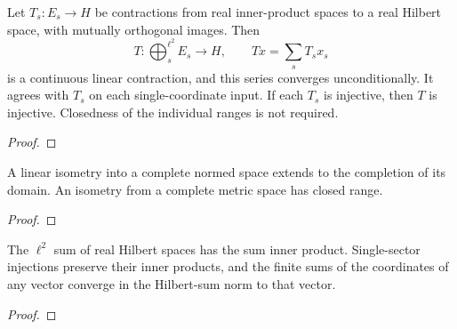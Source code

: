 \begin{supporting}
\begin{theorem}
\label{thm:orthogonal-contraction-synthesis}
\leanok
Let $T_s:E_s\to H$ be contractions from real inner-product spaces to a real
Hilbert space, with mutually orthogonal images. Then
\[
 T:\bigoplus_s^{\ell^2} E_s\longrightarrow H,\qquad
 Tx=\sum_s T_sx_s
\]
is a continuous linear contraction, and this series converges unconditionally.
It agrees with $T_s$ on each single-coordinate input. If each $T_s$ is injective,
then $T$ is injective. Closedness of the individual ranges is not required.
\end{theorem}
\begin{proof}
\leanok
\end{proof}

\begin{theorem}
\label{thm:mathlib-isometry-completion}
\mathlibok
A linear isometry into a complete normed space extends to the completion of its
domain. An isometry from a complete metric space has closed range.
\end{theorem}
\begin{proof}
\mathlibok
\end{proof}

\begin{theorem}
\label{thm:mathlib-hilbert-sums}
\mathlibok
The $\ell^2$ sum of real Hilbert spaces has the sum inner product. Single-sector
injections preserve their inner products, and the finite sums of the coordinates
of any vector converge in the Hilbert-sum norm to that vector.
\end{theorem}
\begin{proof}
\mathlibok
\end{proof}


\end{supporting}
